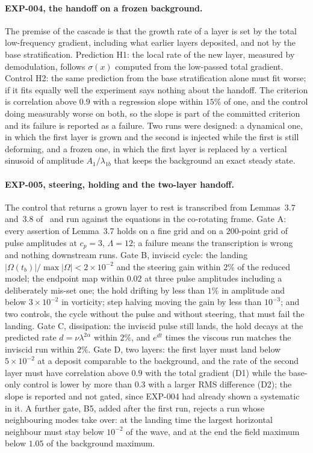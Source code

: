 \documentclass[11pt]{article}
\theoremstyle{remark}
\begin{document}
\paragraph{EXP-004, the handoff on a frozen background.} The premise of the cascade is that the growth rate of
a layer is set by the total low-frequency gradient, including what earlier layers deposited, and not by the
base stratification. Prediction H1: the local rate of the new layer, measured by demodulation, follows
$\sigma(x)$ computed from the low-passed total gradient. Control H2: the same prediction from the base
stratification alone must fit worse; if it fits equally well the experiment says nothing about the handoff.
The criterion is correlation above $0.9$ with a regression slope within $15\%$ of one, and the control doing
measurably worse on both, so the slope is part of the committed criterion and its failure is reported as a
failure. Two runs were designed: a dynamical one, in which the first layer is grown and the second is
injected while the first is still deforming, and a frozen one, in which the first layer is replaced by a
vertical sinusoid of amplitude $A_{1}/\lambda_{1b}$ that keeps the background an exact steady state.

\paragraph{EXP-005, steering, holding and the two-layer handoff.} The control that returns a grown layer to
rest is transcribed from Lemmas~3.7 and~3.8 of~\cite{ab-boussinesq} and run against the equations in the
co-rotating frame. Gate A: every assertion of Lemma~3.7 holds on a fine grid and on a $200$-point grid of
pulse amplitudes at $c_{p}=3$, $\Lambda=12$; a failure means the transcription is wrong and nothing
downstream runs. Gate B, inviscid cycle: the landing $|\Omega(t_{b})|/\max|\Omega|<2\times10^{-2}$ and the
steering gain within $2\%$ of the reduced model; the endpoint map within $0.02$ at three pulse amplitudes
including a deliberately mis-set one; the hold drifting by less than $1\%$ in amplitude and below $3\times10^{-2}$
in vorticity; step halving moving the gain by less than $10^{-3}$; and two controls, the cycle without the pulse
and without steering, that must fail the landing. Gate C, dissipation: the inviscid pulse still lands, the hold
decays at the predicted rate $d=\nu\lambda^{2\alpha}$ within $2\%$, and $e^{dt}$ times the viscous run matches
the inviscid run within $2\%$. Gate D, two layers: the first layer must land below $5\times10^{-2}$ at a deposit
comparable to the background, and the rate of the second layer must have correlation above $0.9$ with the total
gradient (D1) while the base-only control is lower by more than $0.3$ with a larger RMS difference (D2); the
slope is reported and not gated, since EXP-004 had already shown a systematic in it. A further gate, B5, added after
the first run, rejects a run whose neighbouring modes take over: at the landing time the largest horizontal
neighbour must stay below $10^{-2}$ of the wave, and at the end the field maximum below $1.05$ of the
background maximum.
\end{document}
